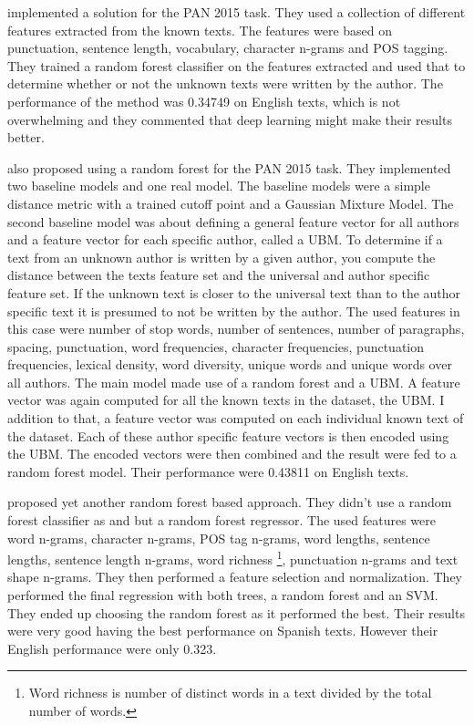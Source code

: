 \cite{maitra2015} implemented a solution for the PAN 2015 task. They used a
collection of different features extracted from the known texts. The features
were based on punctuation, sentence length, vocabulary, character n-grams and
\gls{POS} tagging. They trained a random forest classifier on the features
extracted and used that to determine whether or not the unknown texts were
written by the author. The performance of the method was 0.34749 on English
texts, which is not overwhelming and they commented that deep learning might
make their results better.

\cite{pacheco2015} also proposed using a random forest for the PAN 2015 task.
They implemented two baseline models and one real model. The baseline models
were a simple distance metric with a trained cutoff point and a Gaussian Mixture
Model. The second baseline model was about defining a general feature vector for
all authors and a feature vector for each specific author, called a \gls{UBM}.
To determine if a text from an unknown author is written by a given author,
you compute the distance between the texts feature set and the universal and
author specific feature set. If the unknown text is closer to the universal
text than to the author specific text it is presumed to not be written by
the author. The used features in this case were number of stop words, number
of sentences, number of paragraphs, spacing, punctuation, word frequencies,
character frequencies, punctuation frequencies, lexical density, word diversity,
unique words and unique words over all authors. The main model made use of a
random forest and a \gls{UBM}. A feature vector was again computed for all
the known texts in the dataset, the \gls{UBM}. I addition to that, a feature
vector was computed on each individual known text of the dataset. Each of these
author specific feature vectors is then encoded using the \gls{UBM}. The encoded
vectors were then combined and the result were fed to a random forest model.
Their performance were 0.43811 on English texts.

\cite{bartoli2015b} proposed yet another random forest based approach.
They didn't use a random forest classifier as \cite{maitra2015} and
\cite{pacheco2015} but a random forest regressor. The used features were word
n-grams, character n-grams, \gls{POS} tag n-grams, word lengths, sentence
lengths, sentence length n-grams, word richness \footnote{Word richness is
number of distinct words in a text divided by the total number of words.},
punctuation n-grams and text shape n-grams. They then performed a feature
selection and normalization. They performed the final regression with both
trees, a random forest and an SVM. They ended up choosing the random forest as
it performed the best. Their results were very good having the best performance
on Spanish texts. However their English performance were only 0.323.

